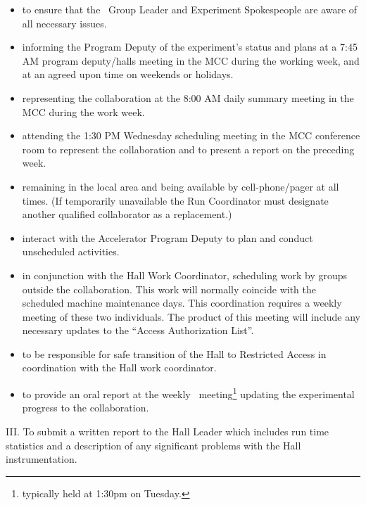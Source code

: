 \documentclass[10pt]{article}
\begin{document}
\begin{itemize}

\item to ensure that the \HALL\ Group Leader and Experiment
Spokespeople are  aware of all necessary issues.

\item informing the Program Deputy of the experiment's status and plans at 
a 7:45 AM program deputy/halls meeting in the MCC during the working week, and at an agreed
upon time on weekends or holidays.

\item representing the collaboration at the 8:00 AM daily summary meeting in the MCC
during the work week. 

\item attending the 1:30 PM Wednesday scheduling meeting in the MCC conference 
room to represent the collaboration and to present a report on the
preceding week.

\item remaining in the local area and being available by cell-phone/pager 
at all times.  (If temporarily unavailable the Run Coordinator must designate another 
qualified collaborator as a replacement.)

 

\item interact with the Accelerator Program Deputy to plan and conduct
unscheduled activities.

\item in conjunction with the Hall Work Coordinator, scheduling
work by groups outside the collaboration. This work will
normally coincide with the scheduled  machine maintenance days.
This coordination requires a weekly meeting of these  two
individuals. The product of this meeting will include any necessary
updates to the ``Access  Authorization List''.

\item to be responsible for safe transition of the Hall to
Restricted Access in coordination with the Hall work
coordinator.

\item to provide an oral report at the weekly \HALL\
meeting\footnote{typically held at 1:30pm on Tuesday.} updating the
experimental progress to the collaboration.


\end{itemize}

\noindent III. To submit a written report to the Hall Leader which includes
run time statistics and a description of any significant problems with the 
Hall instrumentation.
\end{document}
